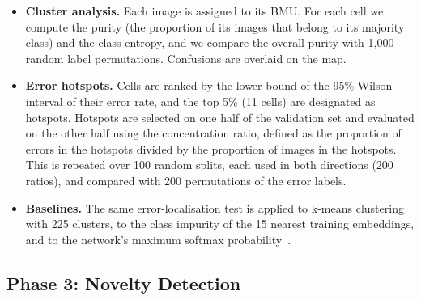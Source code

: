 \documentclass{scrartcl}
\begin{document}
\begin{itemize}
  \item \textbf{Cluster analysis.} Each image is assigned to its BMU. For each cell we compute the purity (the proportion of its images that belong to its majority class) and the class entropy, and we compare the overall purity with 1,000 random label permutations. Confusions are overlaid on the map.
  \item \textbf{Error hotspots.} Cells are ranked by the lower bound of the 95\% Wilson interval of their error rate, and the top 5\% (11 cells) are designated as hotspots. Hotspots are selected on one half of the validation set and evaluated on the other half using the concentration ratio, defined as the proportion of errors in the hotspots divided by the proportion of images in the hotspots. This is repeated over 100 random splits, each used in both directions (200 ratios), and compared with 200 permutations of the error labels.
  \item \textbf{Baselines.} The same error-localisation test is applied to k-means clustering with 225 clusters, to the class impurity of the 15 nearest training embeddings, and to the network's maximum softmax probability~\cite{hendrycks2017baseline}.
\end{itemize}

\subsection{Phase 3: Novelty Detection}
\end{document}
